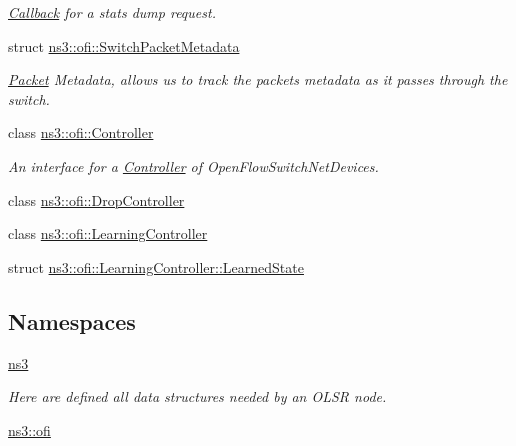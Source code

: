 \begin{DoxyCompactItemize}
\begin{DoxyCompactList}\small\item\em \hyperlink{classns3_1_1Callback}{Callback} for a stats dump request. \end{DoxyCompactList}\item 
struct \hyperlink{structns3_1_1ofi_1_1SwitchPacketMetadata}{ns3\+::ofi\+::\+Switch\+Packet\+Metadata}
\begin{DoxyCompactList}\small\item\em \hyperlink{classns3_1_1Packet}{Packet} Metadata, allows us to track the packet\textquotesingle{}s metadata as it passes through the switch. \end{DoxyCompactList}\item 
class \hyperlink{classns3_1_1ofi_1_1Controller}{ns3\+::ofi\+::\+Controller}
\begin{DoxyCompactList}\small\item\em An interface for a \hyperlink{classns3_1_1ofi_1_1Controller}{Controller} of Open\+Flow\+Switch\+Net\+Devices. \end{DoxyCompactList}\item 
class \hyperlink{classns3_1_1ofi_1_1DropController}{ns3\+::ofi\+::\+Drop\+Controller}
\item 
class \hyperlink{classns3_1_1ofi_1_1LearningController}{ns3\+::ofi\+::\+Learning\+Controller}
\item 
struct \hyperlink{structns3_1_1ofi_1_1LearningController_1_1LearnedState}{ns3\+::ofi\+::\+Learning\+Controller\+::\+Learned\+State}
\end{DoxyCompactItemize}
\subsection*{Namespaces}
\begin{DoxyCompactItemize}
\item 
 \hyperlink{namespacens3}{ns3}
\begin{DoxyCompactList}\small\item\em Here are defined all data structures needed by an O\+L\+SR node. \end{DoxyCompactList}\item 
 \hyperlink{namespacens3_1_1ofi}{ns3\+::ofi}
\end{DoxyCompactItemize}
